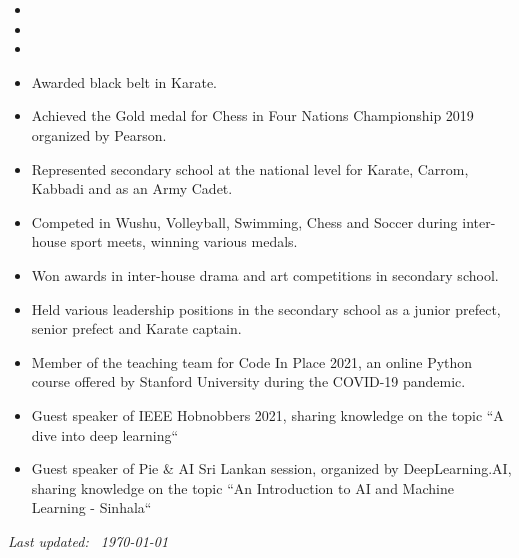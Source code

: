 \documentclass[10pt,a4paper,ragged2e,withhyper]{altacv}
\begin{document}

\begin{itemize}
    \item {}
    \item {}
    \item {}
\end{itemize}

\smallskip
{}
\begin{itemize}
    \item Awarded black belt in Karate.
    \item Achieved the Gold medal for Chess in Four Nations Championship 2019 organized by Pearson.
    \item Represented secondary school at the national level for Karate, Carrom, Kabbadi and as an Army Cadet. 
    \item Competed in Wushu, Volleyball, Swimming, Chess and Soccer during inter-house sport meets, winning various medals.
    \item Won awards in inter-house drama and art competitions in secondary school.
    \item Held various leadership positions in the secondary school as a junior prefect, senior prefect and Karate captain.
\end{itemize}

\smallskip

\begin{itemize}
    \item Member of the teaching team for Code In Place 2021, an online Python course offered by Stanford University during the COVID-19 pandemic. 
    \item Guest speaker of IEEE Hobnobbers 2021, sharing knowledge on the topic ``A dive into deep learning``
    \item Guest speaker of Pie \& AI Sri Lankan session, organized by DeepLearning.AI, sharing knowledge on the topic ``An Introduction to AI and Machine Learning - Sinhala``
\end{itemize}

\smallskip



\vfill
\begin{flushright}
\flushright
\footnotesize{\emph{Last updated: ~\today }}
\end{flushright}
\end{document}

